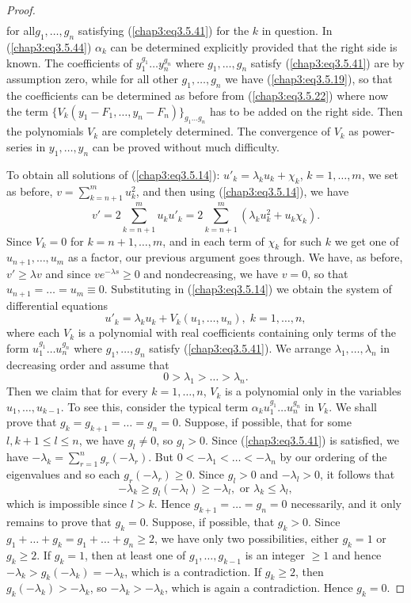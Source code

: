 \begin{proof}
\begin{align*}
\end{align*}
for all\pageoriginale $g_1, \ldots, g_n$ satisfying
(\ref{chap3:eq3.5.41}) for the $k$ in question. In
(\ref{chap3:eq3.5.44}) $\alpha_k$ can be determined explicitly
provided that the right side is known. The coefficients of $y^{g_1}_1
\ldots y^{g_n}_n$ where $g_1, \ldots, g_n$ satisfy
(\ref{chap3:eq3.5.41}) are by assumption zero, while for all other
$g_1, \ldots, g_n$ we have (\ref{chap3:eq3.5.19}), so that the
coefficients can be determined as before from (\ref{chap3:eq3.5.22})
where now the term $\{V_k(y_1-F_1, \ldots, y_n - F_n)\}_{g_1 \ldots
  g_n}$ has to be added on the right side. Then the polynomials $V_k$
are completely determined. The convergence of $V_k$ as power-series in
$y_1, \ldots, y_n$ can be proved without much difficulty. 

To obtain all solutions of (\ref{chap3:eq3.5.14}): $u'_k = \lambda_k
u_k + \chi_k$, $k = 1, \ldots, m$, we set as before, $v=
\sum\limits^m_{k=n+1} u^2_k$, and then using (\ref{chap3:eq3.5.14}),
we have 
$$
v' = 2 \sum\limits^m_{k=n+1} u_k u'_k = 2\sum\limits^m_{k=n+1}
(\lambda_k u^2_k + u_k \chi_k ). 
$$
Since $V_k = 0$ for $k = n+1, \ldots, m$, and in each term of $\chi_k$
for such $k$ we get one of $u_{n+1}, \ldots, u_m$ as a factor, our
previous argument goes through. We have, as before, $v' \geq \lambda
v$ and since $ve^{-\lambda s} \geq 0$ and nondecreasing, we have
$v=0$, so that $u_{n+1} = \ldots = u_m \equiv 0$. Substituting in
(\ref{chap3:eq3.5.14}) we obtain the system of differential equations 
$$
u'_k = \lambda_k u_k + V_k (u_1, \ldots, u_n), \; k = 1, \ldots, n,
$$
where each $V_k$ is a polynomial with real coefficients containing
only terms of the form $u^{g_1}_1 \ldots u^{g_n}_n$ where $g_1,
\ldots, g_n$ satisfy (\ref{chap3:eq3.5.41}). We arrange $\lambda_1,
\ldots, \lambda_n$ in decreasing order and assume that  
$$
0 > \lambda_1 > \ldots > \lambda_n. 
$$\pageoriginale
Then we claim that for every $k=1, \ldots, n$, $V_k$ is a polynomial
only in the variables $u_1, \ldots, u_{k-1}$. To see this, consider
the typical term $\alpha_k u^{g_1}_1 \ldots u^{g_n}_n$ in $V_k$. We
shall prove that $g_k = g_{k+1} = \ldots = g_n = 0$. Suppose, if
possible, that for some $l, k +1 \leq l \leq n$, we have $g_l \neq 0$,
so $g_l >0$. Since (\ref{chap3:eq3.5.41}) is satisfied, we have
$-\lambda_k = \sum\limits^n_{r=1} g_r(-\lambda_r)$. But $0 < -
\lambda_1 < \ldots < - \lambda_n$ by our ordering of the eigenvalues
and so each $g_r(-\lambda_r) \geq 0$. Since $g_l > 0$ and $-\lambda_l
> 0$, it follows that  
$$
-\lambda_k \geq g_l (-\lambda_l) \geq -\lambda_l, \text{ or }
\lambda_k \leq \lambda_l,  
$$
which is impossible since $l>k$. Hence $g_{k+1} = \ldots = g_n =0$
necessarily, and it only remains to prove that $g_k=0$. Suppose, if
possible, that $g_k > 0$. Since $g_1 + \ldots + g_k = g_1 + \ldots +
g_n \geq 2$, we have only two possibilities, either $g_k=1$ or $g_k
\geq 2$. If $g_k =1$, then at least one of $g_1, \ldots, g_{k-1}$ is
an integer $\geq 1$ and hence $-\lambda_k > g_k (-\lambda_k) = -
\lambda_k$, which is a contradiction. If $g_k \geq 2$, then
$g_k(-\lambda_k) > - \lambda_k$, so $-\lambda_k > -\lambda_k$, which
is again a contradiction. Hence $g_k = 0$. 


\end{proof}
